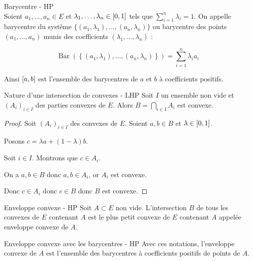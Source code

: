 
\begin{definition}{Barycentre - HP}{}
    \\Soient $a_1, \dots, a_n \in E$ et $\lambda_1, \dots, \lambda_n \in \left[0, 1\right]$
    tels que $\sum_{i = 1}^n \lambda_i = 1$.
    On appelle barycentre du système $\{(a_1, \lambda_1), \dots, (a_n, \lambda_n)\}$
    ou barycentre des points $(a_1, \dots, a_n)$ munis des coefficients $(\lambda_1, \dots, \lambda_n)$ :

    \[\operatorname{Bar}(\left\{(a_1, \lambda_1), \dots, (a_n, \lambda_n)\right\}) = \sum_{i = 1}^n \lambda_i a_i\]

    Ainsi $\left[a, b\right]$ est l'ensemble des barycentres de $a$ et $b$ à coefficients positifs. 
\end{definition}

\begin{proposition}{Nature d'une intersection de convexes - LHP}{}
    Soit $I$ un ensemble non vide et $(A_i)_{i \in I}$ des parties convexes de $E$. 
    Alors $\displaystyle B = \bigcap_{i \in I} A_i$ est convexe.
\end{proposition}


\begin{proof}
    Soit $(A_i)_{i \in I}$ des convexes de $E$. 
    Soient $a, b \in B$ et $\lambda \in \left[0, 1\right]$.
     
    Posons $c = \lambda a + (1 - \lambda)b$. 

    Soit $i \in I$. Montrons que $c \in A_i$. 

    On a $a, b \in B$ donc $a, b \in A_i$, or $A_i$ est convexe. 

    Donc $c \in A_i$ donc $c \in B$ donc $B$ est convexe. 
\end{proof}

\begin{definition}{Enveloppe convexe - HP}{}
    Soit $A \subset E$ non vide. L'intersection $B$ de tous les convexes de $E$ contenant $A$ est le plus petit convexe
    de $E$ contenant $A$ appelée enveloppe convexe de $A$.
\end{definition}

\begin{theoreme}{Enveloppe convexe avec les barycentres - HP}{}
    Avec ces notations, l'enveloppe convexe de $A$ est l'ensemble des barycentres à
    coefficients positifs de points de $A$. 
\end{theoreme}

